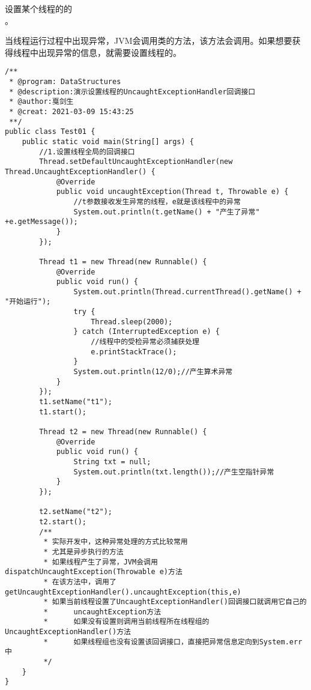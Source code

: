 \documentclass[a4paper]{report}
\begin{document}
设置某个线程的的\\ 。

当线程运行过程中出现异常，JVM会调用类的方法，该方法会调用。如果想要获得线程中出现异常的信息，就需要设置线程的。

\begin{Verbatim}[frame=single,numbersep=5pt,xleftmargin=1.5em,xrightmargin=1.5em]
/**
 * @program: DataStructures
 * @description:演示设置线程的UncaughtExceptionHandler回调接口
 * @author:戛剑生
 * @creat: 2021-03-09 15:43:25
 **/
public class Test01 {
    public static void main(String[] args) {
        //1.设置线程全局的回调接口
        Thread.setDefaultUncaughtExceptionHandler(new Thread.UncaughtExceptionHandler() {
            @Override
            public void uncaughtException(Thread t, Throwable e) {
                //t参数接收发生异常的线程，e就是该线程中的异常
                System.out.println(t.getName() + "产生了异常" +e.getMessage());
            }
        });

        Thread t1 = new Thread(new Runnable() {
            @Override
            public void run() {
                System.out.println(Thread.currentThread().getName() + "开始运行");
                try {
                    Thread.sleep(2000);
                } catch (InterruptedException e) {
                    //线程中的受检异常必须捕获处理
                    e.printStackTrace();
                }
                System.out.println(12/0);//产生算术异常
            }
        });
        t1.setName("t1");
        t1.start();

        Thread t2 = new Thread(new Runnable() {
            @Override
            public void run() {
                String txt = null;
                System.out.println(txt.length());//产生空指针异常
            }
        });

        t2.setName("t2");
        t2.start();
        /**
         * 实际开发中，这种异常处理的方式比较常用
         * 尤其是异步执行的方法
         * 如果线程产生了异常，JVM会调用dispatchUncaughtException(Throwable e)方法
         * 在该方法中，调用了getUncaughtExceptionHandler().uncaughtException(this,e)
         * 如果当前线程设置了UncaughtExceptionHandler()回调接口就调用它自己的
         *      uncaughtException方法
         *      如果没有设置则调用当前线程所在线程组的UncaughtExceptionHandler()方法
         *      如果线程组也没有设置该回调接口，直接把异常信息定向到System.err中
         */
    }
}\end{Verbatim}
\end{document}
